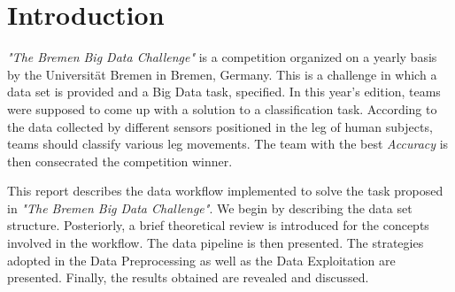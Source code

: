 %
%
%
%
%


\section{Introduction}

\textit{"The Bremen Big Data Challenge"} is a competition organized on a yearly
basis by the Universität Bremen in Bremen, Germany. This is a challenge in which 
a data set is provided and a Big Data task, specified. In this year's
edition, teams were supposed to come up with a solution to a classification 
task. According to the data collected by different sensors positioned in the leg
of human subjects, teams should classify various leg movements. The team with
the best \textit{Accuracy} is then consecrated the competition winner.

This report describes the data workflow implemented to solve the task proposed
in \textit{"The Bremen Big Data Challenge"}. We begin by describing the data
set structure. Posteriorly, a brief theoretical review is introduced for the 
concepts involved in the workflow. The data pipeline is then presented. The
strategies adopted in the Data Preprocessing as well as the Data Exploitation
are presented. Finally, the results obtained are revealed and discussed.


